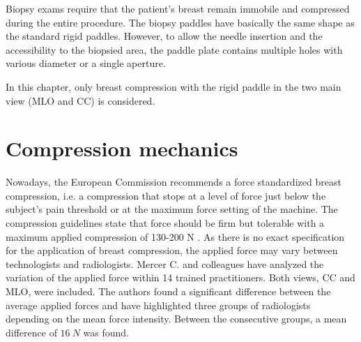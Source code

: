 Biopsy exams require that the patient's breast remain immobile and compressed during the entire procedure. The biopsy paddles have basically the same shape as the standard rigid paddles. However, to allow the needle insertion and the accessibility to the biopsied area, the paddle plate contains multiple holes with various diameter or a single aperture. 

In this chapter, only breast compression with the rigid paddle in the two main view (MLO and CC) is considered.

\section{Compression mechanics} \label{subsec:compressionmechanics}
Nowadays, the European Commission recommends a force standardized breast compression, i.e. a compression that stops at a level of force just below the subject's pain threshold or at the maximum force setting of the machine.  The compression guidelines state that force should be firm but tolerable with a maximum applied compression of 130-200 N \citep{perry_european_2008}. As there is no exact specification for the application of breast compression, the applied force may vary between technologists and radiologists. Mercer C. and colleagues \citep{mercer_practitioner_2013} have analyzed the variation of the applied force within 14 trained practitioners. Both views, CC and MLO, were included. The authors found a significant difference between the average applied forces and have highlighted three groups of radiologists depending on the mean force intensity. Between the consecutive groups, a mean difference of $16 \ N$ was found. 

